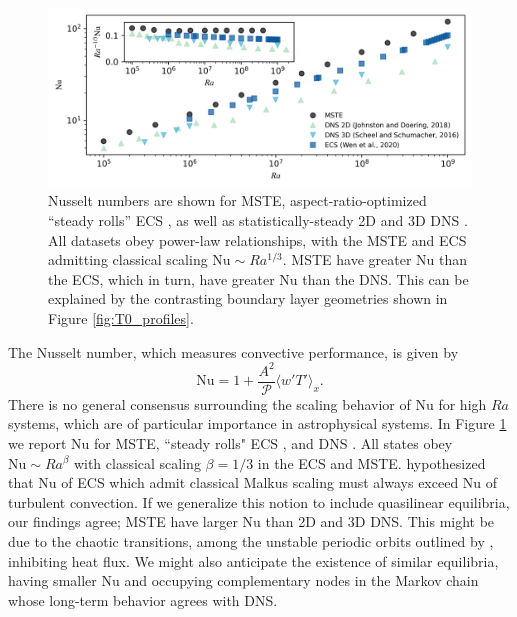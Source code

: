 \documentclass[reprint,amsmath,amssymb,aps]{revtex4-1}
\newcommand\Nu{\mathrm{Nu}}
\begin{document}
\begin{figure}
    \centering
    \includegraphics[width=7.1in]{nu_ra.PNG}
    \caption{Nusselt numbers are shown for MSTE, aspect-ratio-optimized ``steady rolls'' ECS \cite{Wen}, as well as statistically-steady 2D and 3D DNS \cite{Johnston, Scheel_2016}.
    All datasets obey power-law relationships, with the MSTE and ECS admitting classical scaling $\Nu \sim Ra^{1/3}$. 
    MSTE have greater $\Nu$ than the ECS, which in turn, have greater $\Nu$ than the DNS. This can be explained by the contrasting boundary layer geometries shown in Figure \ref{fig:T0_profiles}.}%
    \label{fig:nu_vs_ra}%
\end{figure}

The Nusselt number, which measures convective performance, is given by
\begin{equation}
  \Nu = 1 + \frac{A^2}{\mathcal{P}} \langle w'T' \rangle_x.
\end{equation}
There is no general consensus surrounding the scaling behavior of $\Nu$ for high $Ra$ systems, which are of particular importance in astrophysical systems. In Figure \ref{fig:nu_vs_ra} we report $\Nu$ for MSTE, ``steady rolls" ECS \cite{Wen}, and DNS \cite{Scheel_2016, Johnston}. 
All states obey $\Nu \sim Ra^{\beta}$ with classical scaling $\beta = 1/3$ in the ECS and MSTE. 
\cite{Wen} hypothesized that $\Nu$ of ECS which admit classical Malkus scaling must always exceed $\Nu$ of turbulent convection.
If we generalize this notion to include quasilinear equilibria, our findings agree; MSTE have larger $\Nu$ than 2D and 3D DNS.
This might be due to the chaotic transitions, among the unstable periodic orbits outlined by \cite{Yalniz, Cvitanovic}, inhibiting heat flux. 
We might also anticipate the existence of similar equilibria, having smaller $\Nu$ and occupying complementary nodes in the Markov chain whose long-term behavior agrees with DNS. 
\end{document}
